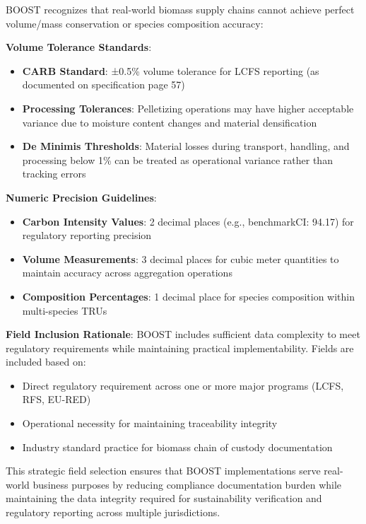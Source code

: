 BOOST recognizes that real-world biomass supply chains cannot achieve perfect volume/mass conservation or species composition accuracy:

\textbf{Volume Tolerance Standards}:
\begin{itemize}
\item \textbf{CARB Standard}: ±0.5\% volume tolerance for LCFS reporting (as documented on specification page 57)
\item \textbf{Processing Tolerances}: Pelletizing operations may have higher acceptable variance due to moisture content changes and material densification
\item \textbf{De Minimis Thresholds}: Material losses during transport, handling, and processing below 1\% can be treated as operational variance rather than tracking errors
\end{itemize}

\textbf{Numeric Precision Guidelines}:
\begin{itemize}
\item \textbf{Carbon Intensity Values}: 2 decimal places (e.g., benchmarkCI: 94.17) for regulatory reporting precision
\item \textbf{Volume Measurements}: 3 decimal places for cubic meter quantities to maintain accuracy across aggregation operations
\item \textbf{Composition Percentages}: 1 decimal place for species composition within multi-species TRUs
\end{itemize}

\textbf{Field Inclusion Rationale}: BOOST includes sufficient data complexity to meet regulatory requirements while maintaining practical implementability. Fields are included based on:
\begin{itemize}
\item Direct regulatory requirement across one or more major programs (LCFS, RFS, EU-RED)
\item Operational necessity for maintaining traceability integrity
\item Industry standard practice for biomass chain of custody documentation
\end{itemize}

This strategic field selection ensures that BOOST implementations serve real-world business purposes by reducing compliance documentation burden while maintaining the data integrity required for sustainability verification and regulatory reporting across multiple jurisdictions.